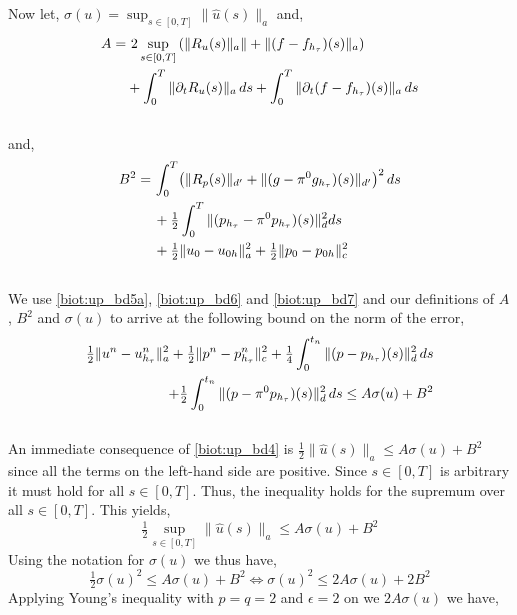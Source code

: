 \\
\\
Now let, $\sigma(u) = \sup_{s \in [0,T]} \| \hat{u}(s)\|_a$ and,
\\
\begin{align*}
A = & \, \, 2 \sup_{s \in [0,T]} \left(\| R_u(s)\|_a\|  + \| (f - f_{h_\tau})(s)\|_a\right) \\
& + \int_0^{T} \| \partial_t R_u (s)\|_a \, ds  + \int_0^{T} \| \partial_t (f - f_{h_\tau})(s)\|_a \, ds \notag
\end{align*}
\\
and,
\begin{align*}
B^2 = & \, \int_0^{T} \bigl( \| R_p(s)\|_{d'} + \|(g-\pi^0g_{h_\tau})(s)\|_{d'}\bigr)^2\, ds \\
& \, + \tfrac{1}{2} \int_0^{T} \|(p_{h_\tau}-\pi^0p_{h_\tau})(s)\|_d^2 ds \notag\\
& \, + \tfrac{1}{2}\|u_0 - u_{0 h} \|^2_a + \tfrac{1}{2}\|p_0 - p_{0 h} \|^2_c \notag
\end{align*}
\\
We use \eqref{biot:up_bd5a}, \eqref{biot:up_bd6} and \eqref{biot:up_bd7} and our definitions of $A$, $B^2$ and $\sigma(u)$ to arrive at the following bound on the norm of the error, 
\\
\begin{align} \label{biot:up_bd4}
\tfrac{1}{2}\|u^n - u^n_{h_\tau} \|^2_a + \tfrac{1}{2}\|p^n - p^n_{h_\tau} \|^2_c
+ \tfrac{1}{4}\int_0^{t_n} \|(p - p_{h_\tau})(s) \|^2_d \, ds \\ 
+ \tfrac{1}{2}\int_0^{t_n} \|(p - \pi^0p_{h_\tau})(s) \|^2_d \, ds \leq A\sigma(u) + B^2 \notag
\end{align}
\\
An immediate consequence of \eqref{biot:up_bd4} is $\tfrac{1}{2}\| \hat{u}(s)\|_a \leq A\sigma(u) + B^2$ since all the terms on the left-hand side are positive. Since $s \in [0,T]$ is arbitrary it must hold for all $s \in [0,T]$. Thus, the inequality holds for the supremum over all $s \in [0,T]$. This yields, 
\begin{equation}
\tfrac{1}{2} \sup_{s \in [0,T]} \| \hat{u}(s)\|_a \leq A \sigma(u) + B^2
\end{equation}
Using the notation for $\sigma(u)$ we thus have, 
\begin{equation}
\tfrac{1}{2} \sigma(u)^2 \leq A \sigma(u) + B^2 \iff \sigma(u)^2 \leq 2A \sigma(u) + 2B^2 
\end{equation}
Applying Young's inequality with $p=q=2$ and $\epsilon=2$ on we $2A \sigma(u)$ we have, 
